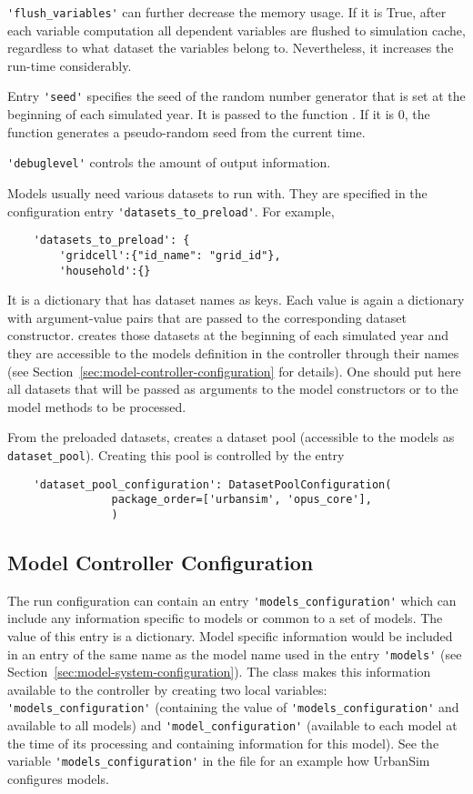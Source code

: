 \verb|'flush_variables'| can further decrease the memory usage.  If it is True, after each variable
computation all dependent variables are flushed to simulation
cache, regardless to what dataset the variables belong to.
Nevertheless, it increases the run-time considerably.

Entry \verb|'seed'| specifies the seed of the random number generator that is set at
the beginning of each simulated year. It is passed to the  
function . If it is 0, the function generates a pseudo-random seed
from the current time.

\verb|'debuglevel'| controls the amount of output information.

Models usually need various datasets to run with. They are specified in the
configuration entry \verb|'datasets_to_preload'|. For example,
\begin{verbatim}
    'datasets_to_preload': {
        'gridcell':{"id_name": "grid_id"},
        'household':{}
\end{verbatim}
It is a dictionary that has dataset names as keys. Each value is again a
dictionary with argument-value pairs that are passed to the corresponding
dataset constructor.  creates those datasets at the
beginning of each simulated year and they are accessible to the models 
definition in the controller through their names (see
Section~\ref{sec:model-controller-configuration} for details). One should put
here all datasets that will be passed as arguments to the model constructors
or to the model methods to be processed.

From the preloaded datasets,  creates a dataset pool (accessible
to the models as \verb|dataset_pool|). Creating this pool is controlled by
the entry
\begin{verbatim}
    'dataset_pool_configuration': DatasetPoolConfiguration(
                package_order=['urbansim', 'opus_core'],
                )
\end{verbatim}


\subsection{Model Controller Configuration}
\label{sec:models-configuration}
\label{sec:model-controller-configuration}
%
The run configuration can contain an entry \verb|'models_configuration'| which can
include any information specific to models or common to a set of models. The
value of this entry is a dictionary.  Model specific information would be
included in an entry of the same name as the model name used in the entry
\verb|'models'| (see Section~\ref{sec:model-system-configuration}). The
 class makes this information available to the controller
by creating two local variables: \verb|'models_configuration'| (containing the
value of \verb|'models_configuration'| and available to all models) and
\verb|'model_configuration'| (available to each model at the time of its
processing and containing information for this model). See the variable
\verb|'models_configuration'| in the file  for an
example how UrbanSim configures models. 

